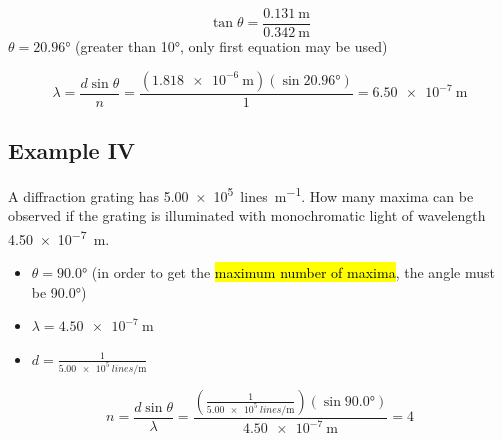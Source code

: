 \documentclass[a4paper,12pt]{article}
\begin{document}
$$\tan{\theta} = \frac{ \SI{0.131}{\m} }{ \SI{0.342}{\m} }$$
$\theta = \ang{20.96}$ (greater than \ang{10}, only first equation may be used)

$$\lambda = \frac{d\sin{\theta}}{n} = \frac{ (\SI{1.818e-6}{\m})(\sin{\ang{20.96}}) }{ \num{1} } = \SI{6.50e-7}{\m}$$

\subsection{Example IV}
A diffraction grating has \SI{5.00e5}{lines\per\m}. How many maxima can be observed if the grating is illuminated with monochromatic light of wavelength \SI{4.50e-7}{\m}.
\begin{itemize}
    \item{$\theta = \ang{90.0}$ (in order to get the \hl{maximum number of maxima}, the angle must be \ang{90.0})}
    \item{$\lambda = \SI{4.50e-7}{\m}$}
    \item{$d = \frac{1}{\SI{5.00e5}{lines\per\m}}$}
\end{itemize}
$$n = \frac{ d \sin{\theta} }{ \lambda } = \frac{ (\frac{1}{\SI{5.00e5}{lines\per\m}})(\sin{\ang{90.0}}) }{ \SI{4.50e-7}{\m} } = 4$$
\end{document}
